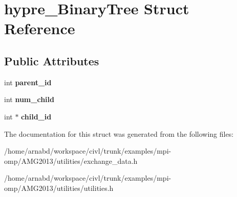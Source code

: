 \hypertarget{structhypre__BinaryTree}{}\section{hypre\+\_\+\+Binary\+Tree Struct Reference}
\label{structhypre__BinaryTree}
\subsection*{Public Attributes}
\begin{DoxyCompactItemize}
\item 
\hypertarget{structhypre__BinaryTree_a677ba7aa93b35020472ce384e3a9c8f3}{}int {\bfseries parent\+\_\+id}\label{structhypre__BinaryTree_a677ba7aa93b35020472ce384e3a9c8f3}

\item 
\hypertarget{structhypre__BinaryTree_a89d6da5ba628e93d4e526404e2797234}{}int {\bfseries num\+\_\+child}\label{structhypre__BinaryTree_a89d6da5ba628e93d4e526404e2797234}

\item 
\hypertarget{structhypre__BinaryTree_aeacd4edbf196eb3260b1883ea3eb7417}{}int $\ast$ {\bfseries child\+\_\+id}\label{structhypre__BinaryTree_aeacd4edbf196eb3260b1883ea3eb7417}

\end{DoxyCompactItemize}


The documentation for this struct was generated from the following files\+:\begin{DoxyCompactItemize}
\item 
/home/arnabd/workspace/civl/trunk/examples/mpi-\/omp/\+A\+M\+G2013/utilities/exchange\+\_\+data.\+h\item 
/home/arnabd/workspace/civl/trunk/examples/mpi-\/omp/\+A\+M\+G2013/utilities/utilities.\+h\end{DoxyCompactItemize}
